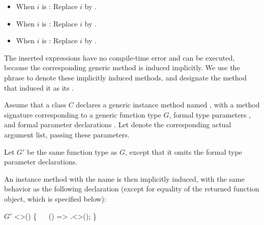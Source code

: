 \documentclass[makeidx]{article}
\begin{document}
{{\begin{itemize}
\item When $i$ is :
  Replace $i$ by .
\item When $i$ is :
  Replace $i$ by .
\item When $i$ is :
  Replace $i$ by .
\end{itemize}

\LMHash{}%
The inserted expressions have no compile-time error and can be executed,
because the corresponding generic method is induced implicitly.
We use the phrase
to denote these implicitly induced methods,
and designate the method that induced it as its
.

\LMHash{}%
Assume that a class $C$ declares a generic instance method named \id,
with a method signature corresponding to a generic function type $G$,
formal type parameters \TypeParametersStd,
and formal parameter declarations .
Let  denote the corresponding actual argument list,
passing these parameters.


\LMHash{}%
Let $G'$ be the same function type as $G$,
except that it omits the formal type parameter declarations.

\LMHash{}%
An instance method with the name \gmiName{} is then implicitly induced,
with the same behavior as the following declaration
(except for equality of the returned function object,
which is specified below):

\begin{normativeDartCode}
$G'$ \gmiName<\TypeParametersStd{}>() \{
\ \ \RETURN{} () => \THIS.\id<>();
\}
\end{normativeDartCode}

}}
\end{document}
